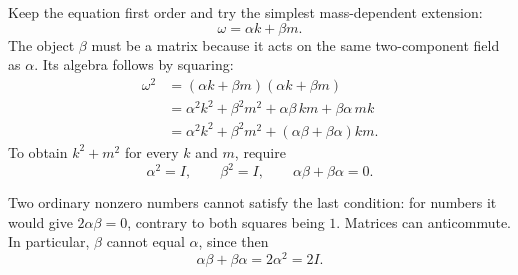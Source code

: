 \begin{classroomqa}
\end{classroomqa}

\begin{classroomqa}
\end{classroomqa}

Keep the equation first order and try the simplest mass-dependent extension:
\begin{equation}
\omega=\alpha k+\beta m.
\end{equation}
The object \(\beta\) must be a matrix because it acts on the same two-component field as \(\alpha\). Its algebra follows by squaring:
\begin{align}
\omega^2
&=(\alpha k+\beta m)(\alpha k+\beta m)\\
&=\alpha^2k^2+\beta^2m^2
+\alpha\beta\,km+\beta\alpha\,mk\\
&=\alpha^2k^2+\beta^2m^2
+(\alpha\beta+\beta\alpha)km.
\end{align}
To obtain \(k^2+m^2\) for every \(k\) and \(m\), require
\begin{equation}
\alpha^2=I,
\qquad
\beta^2=I,
\qquad
\alpha\beta+\beta\alpha=0.
\end{equation}

Two ordinary nonzero numbers cannot satisfy the last condition: for numbers it would give \(2\alpha\beta=0\), contrary to both squares being \(1\). Matrices can anticommute. In particular, \(\beta\) cannot equal \(\alpha\), since then
\begin{equation}
\alpha\beta+\beta\alpha=2\alpha^2=2I.
\end{equation}

